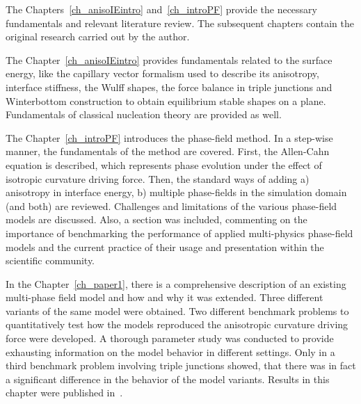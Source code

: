 
The Chapters~\ref{ch_anisoIEintro} and~\ref{ch_introPF} provide the necessary fundamentals and relevant literature review. The subsequent chapters contain the original research carried out by the author.


The Chapter~\ref{ch_anisoIEintro} provides fundamentals related to the surface energy, like the capillary vector formalism used to describe its anisotropy, interface stiffness, the Wulff shapes, the force balance in triple junctions and Winterbottom construction to obtain equilibrium stable shapes on a plane. Fundamentals of classical nucleation theory are provided as well.

The Chapter~\ref{ch_introPF} introduces the phase-field method. In a step-wise manner, the fundamentals of the method are covered. First, the Allen-Cahn equation is described, which represents phase evolution under the effect of isotropic curvature driving force. Then, the standard ways of adding a) anisotropy in interface energy, b) multiple phase-fields in the simulation domain (and both) are reviewed. Challenges and limitations of the various phase-field models are discussed. Also, a section was included, commenting on the importance of benchmarking the performance of applied multi-physics phase-field models and the current practice of their usage and presentation within the scientific community.

In the Chapter~\ref{ch_paper1}, there is a comprehensive description of an existing multi-phase field model and how and why it was extended. Three different variants of the same model were obtained. Two different benchmark problems to quantitatively test how the models reproduced the anisotropic curvature driving force were developed. A thorough parameter study was conducted to provide exhausting information on the model behavior in different settings. Only in a third benchmark problem involving triple junctions showed, that there was in fact a significant difference in the behavior of the model variants. Results in this chapter were published in~\cite{Minar2022}.


